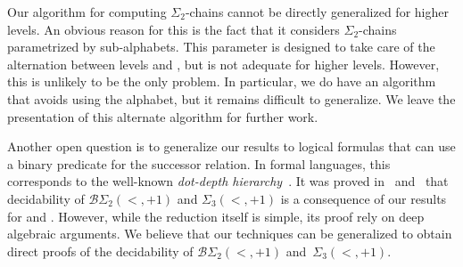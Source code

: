 \documentclass[envcountsame]{llncs}
\newcommand{\dew}[1]{\ensuremath{\Delta_{#1}(<)}\xspace}
\newcommand{\sic}[1]{\ensuremath{\Sigma_{#1}}\xspace}
\newcommand{\siw}[1]{\ensuremath{\Sigma_{#1}(<)}\xspace}
\newcommand{\piw}[1]{\ensuremath{\Pi_{#1}(<)}\xspace}
\newcommand{\bsw}[1]{\ensuremath{\mathcal{B}\Sigma_{#1}(<)}\xspace}
\newcommand{\dewu}{\ensuremath{\Delta_{1}(<)}\xspace}
\newcommand{\siwu}{\ensuremath{\Sigma_{1}(<)}\xspace}
\newcommand{\piwu}{\ensuremath{\Pi_{1}(<)}\xspace}
\newcommand{\bswu}{\ensuremath{\mathcal{B}\Sigma_{1}(<)}\xspace}
\newcommand{\dewd}{\ensuremath{\Delta_{2}(<)}\xspace}
\newcommand{\siwd}{\ensuremath{\Sigma_{2}(<)}\xspace}
\newcommand{\piwd}{\ensuremath{\Pi_{2}(<)}\xspace}
\newcommand{\bswd}{\ensuremath{\mathcal{B}\Sigma_{2}(<)}\xspace}
\newcommand{\dewt}{\ensuremath{\Delta_{3}(<)}\xspace}
\newcommand{\siwt}{\ensuremath{\Sigma_{3}(<)}\xspace}
\newcommand{\piwt}{\ensuremath{\Pi_{3}(<)}\xspace}
\newcommand{\bswt}{\ensuremath{\mathcal{B}\Sigma_{3}(<)}\xspace}
\newcommand{\bspd}{\ensuremath{\mathcal{B}\Sigma_{2}(<,+1)}\xspace}
\newcommand{\sipt}{\ensuremath{\Sigma_{3}(<,+1)}\xspace}
\newcommand{\dewi}{\ensuremath{\Delta_{i}(<)}\xspace}
\newcommand{\siwi}{\ensuremath{\Sigma_{i}(<)}\xspace}
\newcommand{\piwi}{\ensuremath{\Pi_{i}(<)}\xspace}
\newcommand{\bswi}{\ensuremath{\mathcal{B}\Sigma_{i}(<)}\xspace}
\newcommand{\fow}{\ensuremath{\textup{FO}(<)}\xspace}
\newcommand{\restorenotation}{
\let\dew\dews
\let\siw\siws
\let\piw\piws
\let\bsw\bsws
\let\dewu\dewus
\let\siwu\siwus
\let\piwu\piwus
\let\bswu\bswus
\let\dewd\dewds
\let\siwd\siwds
\let\piwd\piwds
\let\bswd\bswds
\let\dewt\dewts
\let\siwt\siwts
\let\piwt\piwts
\let\bswt\bswts
\let\dewi\dewis
\let\siwi\siwis
\let\piwi\piwis
\let\bswi\bswis
\let\fow\fows
}
\newcommand\qchains[1]{\ensuremath{\sic{#1}}-chains\xspace}
\newcommand\dchains{\qchains{2}}
\begin{document}
Our algorithm for computing \dchains cannot be directly generalized
for higher levels. An obvious reason for this is the fact that it
considers \dchains parametrized by sub-alphabets. This parameter is
designed to take care of the alternation between levels  and ,
but is not adequate for higher levels. However, this is unlikely
to be the only problem. In particular, we do have an algorithm that
avoids using the alphabet, but it remains difficult to generalize. We 
leave the presentation of this alternate algorithm for further work.

\restorenotation
Another open question is to generalize our results to logical
formulas that can use a binary predicate  for the successor
relation. In formal languages, this corresponds to the well-known
\emph{dot-depth hierarchy}~\cite{BrzoDot}. It was proved
in~\cite{StrauVD} and~\cite{pinweilVD} that decidability of \bspd and
\sipt is a consequence of our results for \bswd and \siwt.
However, while the reduction itself is simple, its proof rely on deep
algebraic arguments. We believe that our techniques can be generalized
to obtain direct proofs of the decidability of \bspd and~\sipt.
\end{document}
